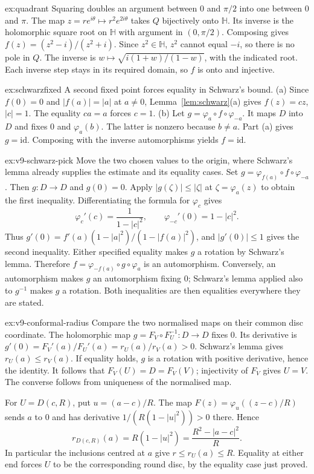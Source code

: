 \begin{solution}{ex:quadrant}
\idea Squaring doubles an argument between $0$ and $\pi/2$ into one between
$0$ and $\pi$.
\writeup The map $z=re^{i\theta}\mapsto r^2e^{2i\theta}$ takes $Q$
bijectively onto $\mathbb H$. Its inverse is the holomorphic square root
on $\mathbb H$ with argument in $(0,\pi/2)$.
Composing gives $f(z)=(z^2-i)/(z^2+i)$. Since $z^2\in\mathbb H$,
$z^2$ cannot equal $-i$, so there is no pole in $Q$.
The inverse is $w\mapsto\sqrt{i(1+w)/(1-w)}$, with the indicated root.
Each inverse step stays in its required domain, so $f$ is onto and injective.
\end{solution}

\begin{solution}{ex:schwarzfixed}
\idea A second fixed point forces equality in Schwarz's bound.
\writeup (a) Since $f(0)=0$ and $|f(a)|=|a|$ at $a\ne0$,
Lemma~\ref{lem:schwarz}(a) gives $f(z)=cz$, $|c|=1$.
The equality $ca=a$ forces $c=1$.
(b) Let $g=\varphi_a\circ f\circ\varphi_{-a}$.
It maps $D$ into $D$ and fixes $0$ and $\varphi_a(b)$.
The latter is nonzero because $b\ne a$. Part (a) gives $g=\mathrm{id}$.
Composing with the inverse automorphisms yields $f=\mathrm{id}$.
\end{solution}

\begin{solution}{ex:v9-schwarz-pick}
\idea Move the two chosen values to the origin, where Schwarz's lemma
already supplies the estimate and its equality cases.
\writeup Set $g=\varphi_{f(a)}\circ f\circ\varphi_{-a}$.
Then $g:D\to D$ and $g(0)=0$. Apply $|g(\zeta)|\le|\zeta|$
at $\zeta=\varphi_a(z)$ to obtain the first inequality.
Differentiating the formula for $\varphi_c$ gives
\[
 \varphi_c'(c)=\frac1{1-|c|^2},\qquad
 \varphi_{-c}'(0)=1-|c|^2.
\]
Thus $g'(0)=f'(a)(1-|a|^2)/(1-|f(a)|^2)$, and
$|g'(0)|\le1$ gives the second inequality.
Either specified equality makes $g$ a rotation by Schwarz's lemma.
Therefore $f=\varphi_{-f(a)}\circ g\circ\varphi_a$ is an automorphism.
Conversely, an automorphism makes $g$ an automorphism fixing $0$;
Schwarz's lemma applied also to $g^{-1}$ makes $g$ a rotation.
Both inequalities are then equalities everywhere they are stated.
\end{solution}

\begin{solution}{ex:v9-conformal-radius}
\idea Compare the two normalised maps on their common disc coordinate.
\writeup The holomorphic map $g=F_V\circ F_U^{-1}:D\to D$ fixes $0$.
Its derivative is
$g'(0)=F_V'(a)/F_U'(a)=r_U(a)/r_V(a)>0$.
Schwarz's lemma gives $r_U(a)\le r_V(a)$.
If equality holds, $g$ is a rotation with positive derivative, hence the
identity. It follows that $F_V(U)=D=F_V(V)$; injectivity of $F_V$ gives
$U=V$. The converse follows from uniqueness of the normalised map.

For $U=D(c,R)$, put $u=(a-c)/R$. The map
$F(z)=\varphi_u((z-c)/R)$ sends $a$ to $0$ and has derivative
$1/(R(1-|u|^2))>0$ there. Hence
\[
 r_{D(c,R)}(a)=R(1-|u|^2)=\frac{R^2-|a-c|^2}{R}.
\]
In particular the inclusions centred at $a$ give
$r\le r_U(a)\le R$. Equality at either end forces $U$ to be the
corresponding round disc, by the equality case just proved.
\end{solution}

